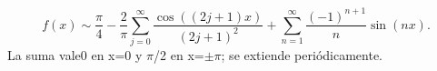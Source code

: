 \[f(x)\sim\frac\pi4-\frac2\pi\sum_{j=0}^{\infty}\frac{\cos((2j+1)x)}{(2j+1)^2}
+\sum_{n=1}^{\infty}\frac{(-1)^{n+1}}n\sin(nx).\]
La suma vale0 en x=0 y \ensuremath{\pi}/2 en x=\ensuremath{\pm}\ensuremath{\pi}; se extiende periódicamente.
